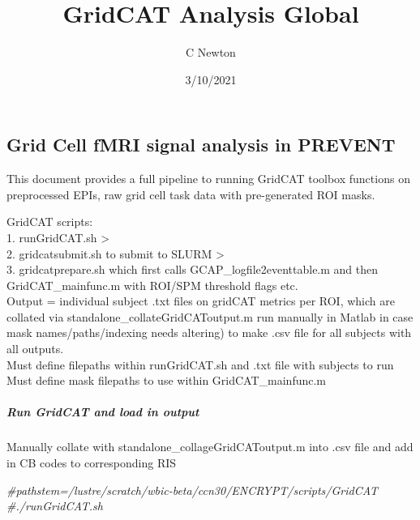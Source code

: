 \documentclass[]{article}
\title{GridCAT Analysis Global}
\author{C Newton}
\date{3/10/2021}
\newenvironment{Shaded}{\begin{snugshade}}{\end{snugshade}}
\newcommand{\CommentTok}[1]{\textcolor[rgb]{0.56,0.35,0.01}{\textit{#1}}}
\newcommand{\DataTypeTok}[1]{\textcolor[rgb]{0.13,0.29,0.53}{#1}}
\newcommand{\KeywordTok}[1]{\textcolor[rgb]{0.13,0.29,0.53}{\textbf{#1}}}
\newcommand{\NormalTok}[1]{#1}
\newcommand{\OperatorTok}[1]{\textcolor[rgb]{0.81,0.36,0.00}{\textbf{#1}}}
\newcommand{\OtherTok}[1]{\textcolor[rgb]{0.56,0.35,0.01}{#1}}
\let\oldsubparagraph\subparagraph
\renewcommand{\subparagraph}[1]{\oldsubparagraph{#1}\mbox{}}
\begin{document}
\maketitle

\hypertarget{grid-cell-fmri-signal-analysis-in-prevent}{%
\subsection{Grid Cell fMRI signal analysis in
PREVENT}\label{grid-cell-fmri-signal-analysis-in-prevent}}

This document provides a full pipeline to running GridCAT toolbox
functions on preprocessed EPIs, raw grid cell task data with
pre-generated ROI masks.

GridCAT scripts:\\
1. runGridCAT.sh \textgreater{}\\
2. gridcatsubmit.sh to submit to SLURM \textgreater{}\\
3. gridcatprepare.sh which first calls GCAP\_logfile2eventtable.m and
then GridCAT\_mainfunc.m with ROI/SPM threshold flags etc.\\
Output = individual subject .txt files on gridCAT metrics per ROI, which
are collated via standalone\_collateGridCAToutput.m run manually in
Matlab in case mask names/paths/indexing needs altering) to make .csv
file for all subjects with all outputs.\\
Must define filepaths within runGridCAT.sh and .txt file with subjects
to run\\
Must define mask filepaths to use within GridCAT\_mainfunc.m

\hypertarget{run-gridcat-and-load-in-output}{%
\subparagraph{Run GridCAT and load in
output}\label{run-gridcat-and-load-in-output}}

Manually collate with standalone\_collageGridCAToutput.m into .csv file
and add in CB codes to corresponding RIS

\begin{Shaded}
\begin{Highlighting}[]
\CommentTok{#pathstem=/lustre/scratch/wbic-beta/ccn30/ENCRYPT/scripts/GridCAT}
\CommentTok{#./runGridCAT.sh}
\end{Highlighting}
\end{Shaded}

\begin{Shaded}
\end{Shaded}
\end{document}
